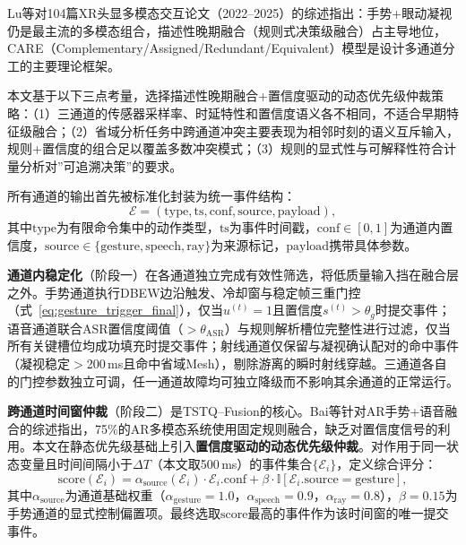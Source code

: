 Lu等\cite{lu2025spatial_computing}对104篇XR头显多模态交互论文（2022--2025）的综述指出：手势+眼动凝视仍是最主流的多模态组合，描述性晚期融合（规则式决策级融合）占主导地位，CARE（Complementary/Assigned/Redundant/Equivalent）模型是设计多通道分工的主要理论框架。

本文基于以下三点考量，选择描述性晚期融合+置信度驱动的动态优先级仲裁策略：（1）三通道的传感器采样率、时延特性和置信度语义各不相同，不适合早期特征级融合；（2）省域分析任务中跨通道冲突主要表现为相邻时刻的语义互斥输入，规则+置信度的组合足以覆盖多数冲突模式；（3）规则的显式性与可解释性符合计量分析对”可追溯决策”的要求。


所有通道的输出首先被标准化封装为统一事件结构：
\begin{equation}
\mathcal{E}=(\mathrm{type}, \mathrm{ts}, \mathrm{conf}, \mathrm{source}, \mathrm{payload}),
\label{eq:fusion_event}
\end{equation}
其中$\mathrm{type}$为有限命令集中的动作类型，$\mathrm{ts}$为事件时间戳，$\mathrm{conf}\in[0,1]$为通道内置信度，$\mathrm{source}\in\{\mathrm{gesture},\mathrm{speech},\mathrm{ray}\}$为来源标记，$\mathrm{payload}$携带具体参数。

\textbf{通道内稳定化}（阶段一）在各通道独立完成有效性筛选，将低质量输入挡在融合层之外。手势通道执行DBEW边沿触发、冷却窗与稳定帧三重门控（式~\ref{eq:gesture_trigger_final}），仅当$u^{(t)}=1$且置信度$s^{(t)}>\theta_g$时提交事件；语音通道联合ASR置信度阈值（$>\theta_{\mathrm{ASR}}$）与规则解析槽位完整性进行过滤，仅当所有关键槽位均成功填充时提交事件；射线通道仅保留与凝视确认配对的命中事件（凝视稳定$>$200\,ms且命中省域Mesh），剔除游离的瞬时射线穿越。三通道各自的门控参数独立可调，任一通道故障均可独立降级而不影响其余通道的正常运行。


\textbf{跨通道时间窗仲裁}（阶段二）是TSTQ--Fusion的核心。Bai等\cite{bai2025ar_gesture_speech}针对AR手势+语音融合的综述指出，75\%的AR多模态系统使用固定规则融合，缺乏对置信度信号的利用。本文在静态优先级基础上引入\textbf{置信度驱动的动态优先级仲裁}。对作用于同一状态变量且时间间隔小于$\Delta T$（本文取500\,ms）的事件集合$\{\mathcal{E}_i\}$，定义综合评分：
\begin{equation}
  \mathrm{score}(\mathcal{E}_i) = \alpha_{\mathrm{source}}(\mathcal{E}_i) \cdot \mathcal{E}_i.\mathrm{conf} + \beta \cdot \mathbb{I}[\mathcal{E}_i.\mathrm{source} = \mathrm{gesture}],
  \label{eq:fusion_score}
\end{equation}
其中$\alpha_{\mathrm{source}}$为通道基础权重（$\alpha_{\mathrm{gesture}}=1.0$，$\alpha_{\mathrm{speech}}=0.9$，$\alpha_{\mathrm{ray}}=0.8$），$\beta=0.15$为手势通道的显式控制偏置项。最终选取$\mathrm{score}$最高的事件作为该时间窗的唯一提交事件。

